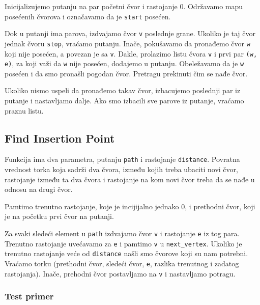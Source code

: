 Inicijalizujemo putanju na par početni čvor i rastojanje 0. Održavamo mapu posećenih čvorova i označavamo da je \texttt{start} posećen. 

Dok u putanji ima parova, izdvajamo čvor \texttt{v} poslednje grane. Ukoliko je taj čvor jednak čvoru \texttt{stop}, vraćamo putanju. Inače, pokušavamo da pronađemo čvor \texttt{w} koji nije posećen, a povezan je sa \texttt{v}. Dakle, prolazimo listu čvora \texttt{v} i prvi par \texttt{(w, e)}, za koji važi da \texttt{w} nije posećen, dodajemo u putanju. Obeležavamo da je \texttt{w} posećen i da smo pronašli pogodan čvor. Pretragu prekinuti čim se nađe čvor. 

Ukoliko nismo uspeli da pronađemo takav čvor, izbacujemo poslednji par iz putanje i nastavljamo dalje. Ako smo izbacili sve parove iz putanje, vraćamo praznu listu.



\subsection{Find Insertion Point}
\label{findInsertionPoint}

Funkcija ima dva parametra, putanju \texttt{path} i rastojanje \texttt{distance}. Povratna vrednost torka koja sadrži dva čvora, između kojih treba ubaciti novi čvor, rastojanje između ta dva čvora i rastojanje na kom novi čvor treba da se nađe u odnosu na drugi čvor.

Pamtimo trenutno rastojanje, koje je incijijalno jednako 0, i prethodni čvor, koji je na početku prvi čvor na putanji.

Za svaki sledeći element u \texttt{path} izdvajamo čvor \texttt{v} i rastojanje \texttt{e} iz tog para. Trenutno rastojanje uvećavamo za \texttt{e} i pamtimo \texttt{v} u \texttt{next\_vertex}. Ukoliko je trenutno rastojanje veće od \texttt{distance} našli smo čvorove koji su nam potrebni. Vraćamo torku (prethodni čvor, sledeći čvor, \texttt{e}, razlika trenutnog i zadatog rastojanja). Inače, prehodni čvor postavljamo na \texttt{v} i nastavljamo potragu.

\newpage





\subsubsection{Test primer}


